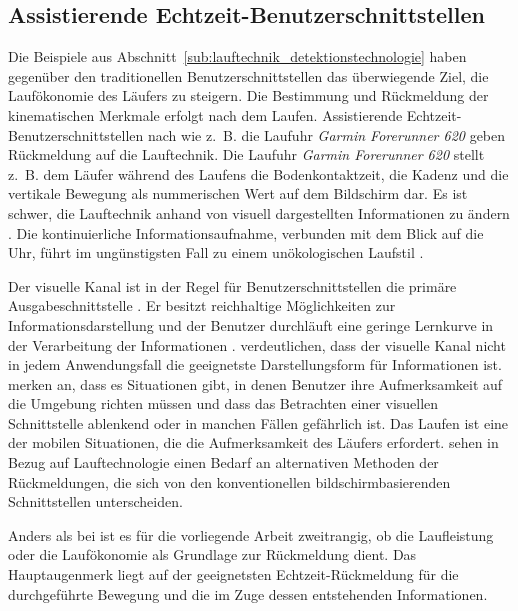 \subsection{Assistierende Echtzeit-Benutzerschnittstellen}
\label{sub:assistierende_echtzeit_benutzerschnittstellen}

Die Beispiele aus Abschnitt~\ref{sub:lauftechnik_detektionstechnologie} haben gegenüber den traditionellen Benutzerschnittstellen das überwiegende Ziel, die Laufökonomie des Läufers zu steigern. Die Bestimmung und Rückmeldung der kinematischen Merkmale erfolgt nach dem Laufen. Assistierende Echtzeit-Benutzerschnittstellen nach \citet{Jensen2014} wie z.~B. die Laufuhr \emph{Garmin Forerunner 620} geben Rückmeldung auf die Lauftechnik. Die Laufuhr \emph{Garmin Forerunner 620} stellt z.~B. dem Läufer während des Laufens die Bodenkontaktzeit, die Kadenz und die vertikale Bewegung als nummerischen Wert auf dem Bildschirm dar. Es ist schwer, die Lauftechnik anhand von visuell dargestellten Informationen zu ändern \citep[vgl.][]{Jensen2014}. Die kontinuierliche Informationsaufnahme, verbunden mit dem Blick auf die Uhr, führt im ungünstigsten Fall zu einem unökologischen Laufstil \citep[vgl.][]{Jensen2014}.

Der visuelle Kanal ist in der Regel für Benutzerschnittstellen die primäre Ausgabeschnittstelle \citep[vgl.][]{Jensen2014}. Er besitzt reichhaltige Möglichkeiten zur Informationsdarstellung und der Benutzer durchläuft eine geringe Lernkurve in der Verarbeitung der Informationen \citep[vgl.][]{Jensen2014}. \citet[][]{Jensen2014} verdeutlichen, dass der visuelle Kanal nicht in jedem Anwendungsfall die geeignetste Darstellungsform für Informationen ist. \citet[][]{Zhao2007} merken an, dass es Situationen gibt, in denen Benutzer ihre Aufmerksamkeit auf die Umgebung richten müssen und dass das Betrachten einer visuellen Schnittstelle ablenkend oder in manchen Fällen gefährlich ist. Das Laufen ist eine der mobilen Situationen, die die Aufmerksamkeit des Läufers erfordert. \citet[][]{Jensen2014} sehen in Bezug auf Lauftechnologie einen Bedarf an alternativen Methoden der Rückmeldungen, die sich von den konventionellen bildschirmbasierenden Schnittstellen unterscheiden.

Anders als bei \citet[][]{Jensen2014} ist es für die vorliegende Arbeit zweitrangig, ob die Laufleistung oder die Laufökonomie als Grundlage zur Rückmeldung dient. Das Hauptaugenmerk liegt auf der geeignetsten Echtzeit-Rückmeldung für die durchgeführte Bewegung und die im Zuge dessen entstehenden Informationen.

